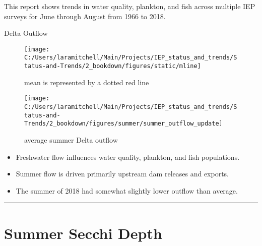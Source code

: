 \documentclass[
]{book}
\providecommand{\tightlist}{%
  \setlength{\itemsep}{0pt}\setlength{\parskip}{0pt}}
\begin{document}
This report shows trends in water quality, plankton, and fish across multiple IEP
surveys for June through August from 1966 to 2018.

Delta Outflow

\begin{figure}
\texttt{[image: C:/Users/laramitchell/Main/Projects/IEP\_status\_and\_trends/Status-and-Trends/2\_bookdown/figures/static/mline]} \caption{mean is represented by a dotted red line}\label{fig:unnamed-chunk-47}
\end{figure}

\begin{figure}
\texttt{[image: C:/Users/laramitchell/Main/Projects/IEP\_status\_and\_trends/Status-and-Trends/2\_bookdown/figures/summer/summer\_outflow\_update]} \caption{average summer Delta outflow}\label{fig:unnamed-chunk-48}
\end{figure}

\begin{itemize}
\tightlist
\item
  Freshwater flow influences water quality, plankton, and fish populations.
\item
  Summer flow is driven primarily upstream dam releases and exports.
\item
  The summer of 2018 had somewhat slightly lower outflow than average.
\end{itemize}

\begin{center}\rule{0.5\linewidth}{0.5pt}\end{center}

\hypertarget{summer-secchi-depth}{%
\section{Summer Secchi Depth}\label{summer-secchi-depth}}
\end{document}

